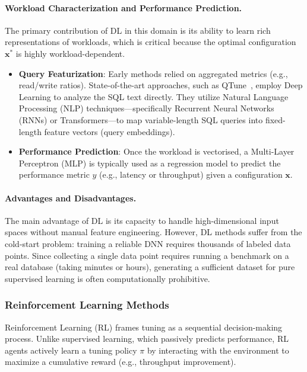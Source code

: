 \paragraph{Workload Characterization and Performance Prediction.}
The primary contribution of DL in this domain is its ability to learn rich representations of workloads, which is critical because the optimal configuration $\mathbf{x}^*$ is highly workload-dependent.
\begin{itemize}
  \item \textbf{Query Featurization}: Early methods relied on aggregated metrics (e.g., read/write ratios). State-of-the-art approaches, such as QTune~\cite{qtune}, employ Deep Learning to analyze the SQL text directly. They utilize Natural Language Processing (NLP) techniques—specifically Recurrent Neural Networks (RNNs) or Transformers—to map variable-length SQL queries into fixed-length feature vectors (query embeddings).
  \item \textbf{Performance Prediction}: Once the workload is vectorised, a Multi-Layer Perceptron (MLP) is typically used as a regression model to predict the performance metric $y$ (e.g., latency or throughput) given a configuration $\mathbf{x}$.
\end{itemize}

\paragraph{Advantages and Disadvantages.}
The main advantage of DL is its capacity to handle high-dimensional input spaces without manual feature engineering.
However, DL methods suffer from the cold-start problem: training a reliable DNN requires thousands of labeled data points.
Since collecting a single data point requires running a benchmark on a real database (taking minutes or hours), generating a sufficient dataset for pure supervised learning is often computationally prohibitive.

\subsubsection{Reinforcement Learning Methods}\label{sec:bg-rl}

Reinforcement Learning (RL) frames tuning as a sequential decision-making process.
Unlike supervised learning, which passively predicts performance, RL agents actively learn a tuning policy $\pi$ by interacting with the environment to maximize a cumulative reward (e.g., throughput improvement).


